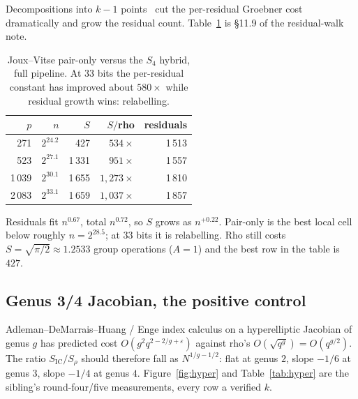 Decompositions into $k-1$ points~\cite{jouxvitse2013} cut the
per-residual Groebner cost dramatically and grow the residual count.
Table~\ref{tab:paironly} is §11.9 of the residual-walk
note.

\begin{table}[t]
\centering
\small
\caption{Joux--Vitse pair-only versus the $S_4$ hybrid, full
  pipeline. At $33$ bits the per-residual constant has improved about
  $580\times$ while residual growth wins: relabelling.}
\label{tab:paironly}
\begin{tabular}{@{}rrrrr@{}}
\toprule
$p$ & $n$ & $S$ & $S/$rho & residuals \\
\midrule
271 & $2^{24.2}$ & 427 & $534\times$ & 1\,513 \\
523 & $2^{27.1}$ & 1\,331 & $951\times$ & 1\,557 \\
1\,039 & $2^{30.1}$ & 1\,655 & $1{,}273\times$ & 1\,810 \\
2\,083 & $2^{33.1}$ & 1\,659 & $1{,}037\times$ & 1\,857 \\
\bottomrule
\end{tabular}
\end{table}

Residuals fit $n^{0.67}$, total $n^{0.72}$, so $S$ grows as
$n^{+0.22}$. Pair-only is the best local cell below roughly
$n=2^{28.5}$; at $33$ bits it is relabelling. Rho still costs
$S=\sqrt{\pi/2}\approx 1.2533$ group operations ($A=1$) and the best
row in the table is $427$.

\subsection{Genus 3/4 Jacobian, the positive control}
\label{sec:ic-hyper}

Adleman--DeMarrais--Huang / Enge index calculus on a hyperelliptic
Jacobian of genus $g$ has predicted cost $O(g^2 q^{2-2/g+\varepsilon})$
against rho's $O(\sqrt{q^g})=O(q^{g/2})$. The ratio
$S_{\mathrm{IC}}/S_{\rho}$ should therefore fall as $N^{1/g-1/2}$:
flat at genus $2$, slope $-1/6$ at genus $3$, slope $-1/4$ at genus
$4$. Figure~\ref{fig:hyper} and Table~\ref{tab:hyper} are the sibling's
round-four/five measurements, every row a verified
$k$.

